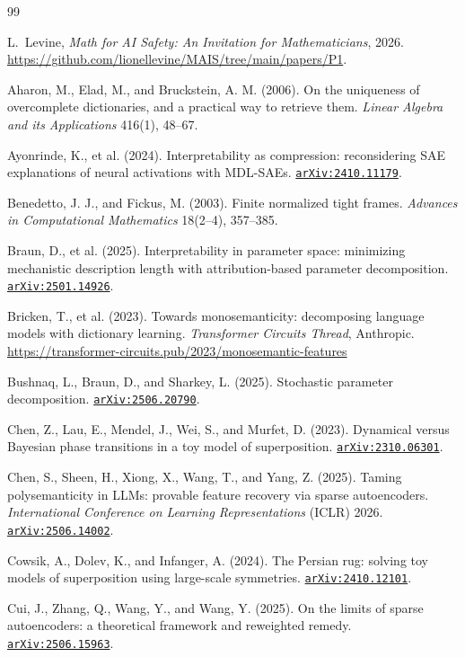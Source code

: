 \documentclass[11pt]{amsart}
\newcommand{\arxiv}[1]{\href{https://arxiv.org/abs/#1}{\texttt{arXiv:#1}}}
\theoremstyle{plain}
\theoremstyle{definition}
\begin{document}
\begin{thebibliography}{99}

L.~Levine,
\emph{Math for AI Safety: An Invitation for Mathematicians},
2026. \url{https://github.com/lionellevine/MAIS/tree/main/papers/P1}.


 Aharon, M., Elad, M., and Bruckstein, A. M. (2006). On the uniqueness of overcomplete dictionaries, and a practical way to retrieve them. \emph{Linear Algebra and its Applications} 416(1), 48--67.

 Ayonrinde, K., et al. (2024). Interpretability as compression: reconsidering SAE explanations of neural activations with MDL-SAEs. \arxiv{2410.11179}.

 Benedetto, J. J., and Fickus, M. (2003). Finite normalized tight frames. \emph{Advances in Computational Mathematics} 18(2--4), 357--385.

 Braun, D., et al. (2025). Interpretability in parameter space: minimizing mechanistic description length with attribution-based parameter decomposition. \arxiv{2501.14926}.

 Bricken, T., et al. (2023). Towards monosemanticity: decomposing language models with dictionary learning. \emph{Transformer Circuits Thread}, Anthropic. \url{https://transformer-circuits.pub/2023/monosemantic-features}

 Bushnaq, L., Braun, D., and Sharkey, L. (2025). Stochastic parameter decomposition. \arxiv{2506.20790}.

 Chen, Z., Lau, E., Mendel, J., Wei, S., and Murfet, D. (2023). Dynamical versus Bayesian phase transitions in a toy model of superposition. \arxiv{2310.06301}.

 Chen, S., Sheen, H., Xiong, X., Wang, T., and Yang, Z. (2025). Taming polysemanticity in LLMs: provable feature recovery via sparse autoencoders. \emph{International Conference on Learning Representations} (ICLR) 2026. \arxiv{2506.14002}.

 Cowsik, A., Dolev, K., and Infanger, A. (2024). The Persian rug: solving toy models of superposition using large-scale symmetries. \arxiv{2410.12101}.

 Cui, J., Zhang, Q., Wang, Y., and Wang, Y. (2025). On the limits of sparse autoencoders: a theoretical framework and reweighted remedy. \arxiv{2506.15963}.


\end{thebibliography}
\end{document}
